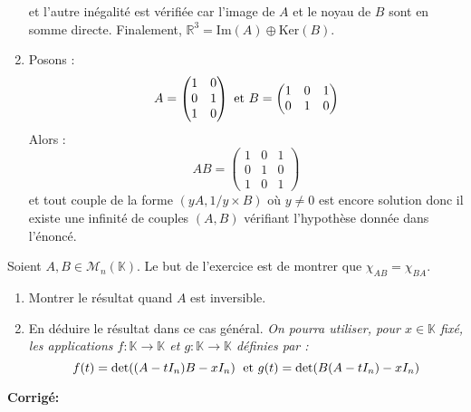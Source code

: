 \documentclass[a4paper,twoside,french,10pt]{VcCours}
\newcommand{\corr}{\textbf{Corrigé:}}
\begin{document}
\begin{enumerate}
et l'autre inégalité est vérifiée car l'image de $A$ et le noyau de $B$ sont en somme directe. Finalement, $\mathbb{R}^3 = \textrm{Im}(A) \oplus \textrm{Ker}(B)$.
\item Posons :
$$ A  = \begin{pmatrix}
1 & 0 \\
0 & 1\\
1 & 0 \\
\end{pmatrix} 
\hbox{ et } B = \begin{pmatrix}
1 & 0 & 1 \\
0 & 1 & 0
\end{pmatrix}$$
Alors :
$$ AB = \begin{pmatrix}
1 & 0 & 1 \\
0 & 1 & 0 \\
1 & 0 & 1 
\end{pmatrix}$$
et tout couple de la forme $(yA, 1/y \times B)$ où $y \neq 0$ est encore solution donc il existe une infinité de couples $(A,B)$ vérifiant l'hypothèse donnée dans l'énoncé.
\end{enumerate}

\begin{Exercice}{} Soient $A,B \in \mathcal{M}_{n}(\mathbb{K})$. Le but de l'exercice est de montrer que $\chi_{AB} = \chi_{BA}$.
\begin{enumerate}
\item Montrer le résultat quand $A$ est inversible.
\item En déduire le résultat dans ce cas général. \textit{On pourra utiliser, pour $x \in \mathbb{K}$ fixé, les applications $f : \mathbb{K} \rightarrow \mathbb{K}$ et $g : \mathbb{K} \rightarrow \mathbb{K}$ définies par :}
$$ f(t) = \textrm{det}((A-t I_n)B -x I_n) \; \hbox{ et } g(t) = \textrm{det}(B(A-tI_n)-xI_n)$$
\end{enumerate}
\end{Exercice}

\corr 
\end{document}
